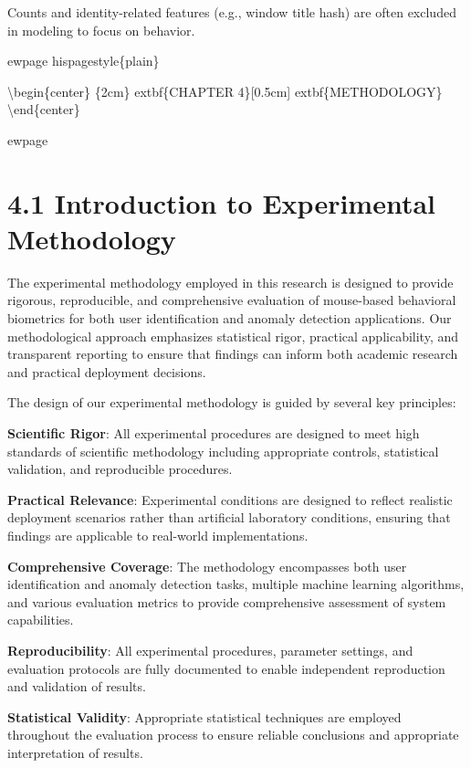 \documentclass[
  12pt,
  a4paper,
]{report}
\begin{document}
Counts and identity-related features (e.g., window title hash) are often
excluded in modeling to focus on behavior.

ewpage hispagestyle\{plain\}

\textbackslash begin\{center\} \vspace*\{2cm\} extbf\{\Large CHAPTER
4\}{[}0.5cm{]} extbf\{\Large METHODOLOGY\} \textbackslash end\{center\}

ewpage

\section{4.1 Introduction to Experimental
Methodology}\label{introduction-to-experimental-methodology}

The experimental methodology employed in this research is designed to
provide rigorous, reproducible, and comprehensive evaluation of
mouse-based behavioral biometrics for both user identification and
anomaly detection applications. Our methodological approach emphasizes
statistical rigor, practical applicability, and transparent reporting to
ensure that findings can inform both academic research and practical
deployment decisions.

The design of our experimental methodology is guided by several key
principles:

\textbf{Scientific Rigor}: All experimental procedures are designed to
meet high standards of scientific methodology including appropriate
controls, statistical validation, and reproducible procedures.

\textbf{Practical Relevance}: Experimental conditions are designed to
reflect realistic deployment scenarios rather than artificial laboratory
conditions, ensuring that findings are applicable to real-world
implementations.

\textbf{Comprehensive Coverage}: The methodology encompasses both user
identification and anomaly detection tasks, multiple machine learning
algorithms, and various evaluation metrics to provide comprehensive
assessment of system capabilities.

\textbf{Reproducibility}: All experimental procedures, parameter
settings, and evaluation protocols are fully documented to enable
independent reproduction and validation of results.

\textbf{Statistical Validity}: Appropriate statistical techniques are
employed throughout the evaluation process to ensure reliable
conclusions and appropriate interpretation of results.
\end{document}
